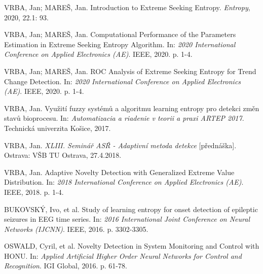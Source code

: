 \documentclass[11pt,twoside,openright]{report}
\begin{document}









\renewcommand{\bibname}{Publikace autora}
\begin{thebibliography}{A}
\end{thebibliography}

\begin{enumerate}[label={[V\arabic*]}]
    \item \label{ese_mdpi} VRBA, Jan; MAREŠ, Jan. Introduction to Extreme Seeking Entropy. \textit{Entropy}, 2020, 22.1: 93.
  	\item \label{appel2}VRBA, Jan; MAREŠ, Jan. Computational Performance of the Parameters Estimation in Extreme Seeking Entropy Algorithm. In: \textit{2020 International Conference on Applied Electronics (AE)}. IEEE, 2020. p. 1-4.
	\item \label{appel3}VRBA, Jan; MAREŠ, Jan. ROC Analysis of Extreme Seeking Entropy for Trend Change Detection. In: \textit{2020 International Conference on Applied Electronics (AE)}. IEEE, 2020. p. 1-4.  
	\item \label{artep}VRBA, Jan. Využití fuzzy systémů a algoritmu learning entropy pro detekci změn stavů bioprocesu. In: \textit{Automatizacia a riadenie v teorii a praxi ARTEP 2017}. Technická univerzita Košice, 2017.

	\item \label{asr} VRBA, Jan. \textit{XLIII. Seminář ASŘ - Adaptivní metoda detekce} [přednáška]. Ostrava: VŠB TU Ostrava, 27.4.2018.
    \item \label{appel1}VRBA, Jan. Adaptive Novelty Detection with Generalized Extreme Value Distribution. In: \textit{2018 International Conference on Applied Electronics (AE)}. IEEE, 2018. p. 1-4.
    \item \label{ijcnn}BUKOVSKÝ, Ivo, et al. Study of learning entropy for onset detection of epileptic seizures in EEG time series. In: \textit{2016 International Joint Conference on Neural Networks (IJCNN)}. IEEE, 2016. p. 3302-3305.

    
    \item \label{cyril}OSWALD, Cyril, et al. Novelty Detection in System Monitoring and Control with HONU. In: \textit{Applied Artificial Higher Order Neural Networks for Control and Recognition}. IGI Global, 2016. p. 61-78.



\end{enumerate}
\end{document}
